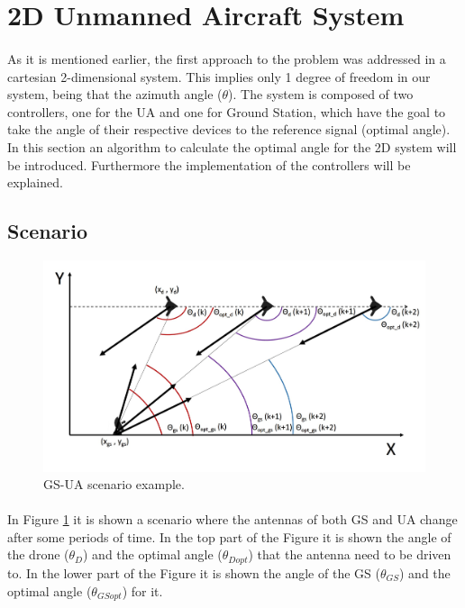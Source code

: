 
\section{2D Unmanned Aircraft System}\label{sec:2d_sim}
\paragraph{}As it is mentioned earlier, the first approach to the problem was addressed in a cartesian 2-dimensional system. This implies only 1 degree of freedom in our system, being that the azimuth angle ($\theta$). The system is composed of two controllers, one for the UA and one for Ground Station, which have the goal to take the angle of their respective devices to the reference signal (optimal angle). In this section an algorithm to calculate the optimal angle for the 2D system will be introduced. Furthermore the implementation of the controllers will be explained.

\subsection*{Scenario}

\begin{figure}[h]
	\centering
	\includegraphics[scale=0.45]{figures/drone_gs_ex_1.jpg}
	\caption{GS-UA scenario example.}
	\label{fig:ua_gs}
\end{figure}

\paragraph{}In Figure \ref{fig:ua_gs} it is shown a scenario where the antennas of both GS and UA change after some periods of time. In the top part of the Figure it is shown the angle of the drone ($\theta_{D}$) and the optimal angle ($\theta_{Dopt}$) that the antenna need to be driven to. In the lower part of the Figure it is shown the angle of the GS ($\theta_{GS}$) and the optimal angle ($\theta_{GSopt}$) for it. 

